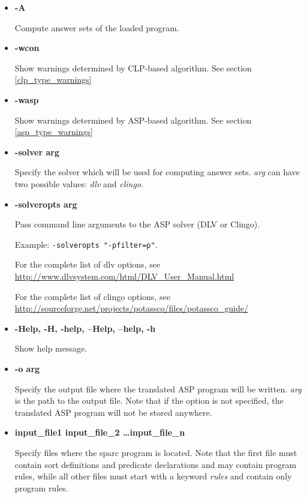 \documentclass[12pt, letterpaper]{article}
\begin{document}
\begin{itemize}
 \item \textbf{-A}
    
  Compute answer sets of the loaded program.

\item \textbf{-wcon}
    
  Show warnings determined by CLP-based algorithm. See section \ref{clp_type_warnings}

\item \textbf{-wasp}
    
  Show warnings determined by ASP-based algorithm. See section \ref{asp_type_warnings}

\item \textbf{-solver arg}

  Specify the solver which will be used for computing answer sets. \textit{arg} can have two possible values: \textit{dlv} and \textit{clingo}. 
\item \textbf{-solveropts arg}

  Pass command line arguments to the ASP solver (DLV or Clingo).
  
  Example: \texttt{-solveropts "-pfilter=p"}.


  For the complete list of dlv options, see 
  \url{http://www.dlvsystem.com/html/DLV_User_Manual.html }


  For the complete list of clingo options, see 
  \url{http://sourceforge.net/projects/potassco/files/potassco_guide/}


\item \textbf{-Help, -H, -help, --Help, --help, -h}

  Show help message.

\item \textbf{-o arg}

  Specify the output file where the translated ASP program will be written. \textit{arg} is the path to the output file. 
  Note that if the option is not specified, the translated ASP program will not be stored anywhere.

\item \textbf{input\_file1 input\_file\_2 \dots input\_file\_n}
  
Specify files where the sparc program is located. Note that the first file must contain sort definitions and predicate declarations and may contain program rules, 
while all other files must start with a keyword \textit{rules} and contain only program rules.



\end{itemize}
\end{document}
